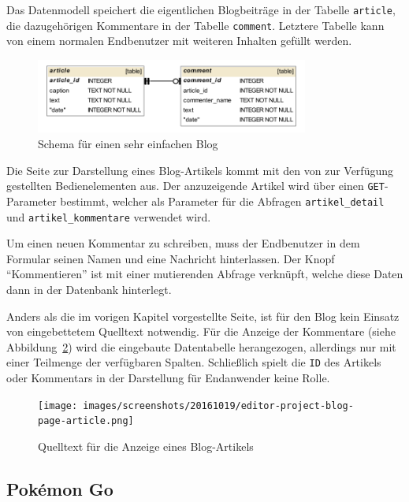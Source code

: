 Das Datenmodell speichert die eigentlichen Blogbeiträge in der Tabelle \texttt{article}, die dazugehörigen Kommentare in der Tabelle \texttt{comment}. Letztere Tabelle kann von einem normalen Endbenutzer mit weiteren Inhalten gefüllt werden.

\begin{figure}[h]
  \centering \includegraphics[width=0.8\textwidth]{images/db-schema/blog}
  \caption{Schema für einen sehr einfachen Blog}
  \label{fig:project-blog-schema}
\end{figure}

Die Seite zur Darstellung eines Blog-Artikels kommt mit den von \idename{} zur Verfügung gestellten Bedienelementen aus. Der anzuzeigende Artikel wird über einen \texttt{GET}-Parameter bestimmt, welcher als Parameter für die Abfragen \texttt{artikel\_detail} und \texttt{artikel\_kommentare} verwendet wird.

Um einen neuen Kommentar zu schreiben, muss der Endbenutzer in dem Formular seinen Namen und eine Nachricht hinterlassen. Der Knopf "`Kommentieren"' ist mit einer mutierenden Abfrage verknüpft, welche diese Daten dann in der Datenbank hinterlegt.

Anders als die im vorigen Kapitel  vorgestellte Seite, ist für den Blog kein Einsatz von eingebettetem Quelltext notwendig. Für die Anzeige der Kommentare (siehe Abbildung~\ref{fig:project-blog-page-article}) wird die eingebaute Datentabelle herangezogen, allerdings nur mit einer Teilmenge der verfügbaren Spalten. Schließlich spielt die \texttt{ID} des Artikels oder Kommentars in der Darstellung für Endanwender keine Rolle.

\begin{figure}[h]
  \centering \texttt{[image: images/screenshots/20161019/editor-project-blog-page-article.png]}
  \caption{Quelltext für die Anzeige eines Blog-Artikels}
  \label{fig:project-blog-page-article}
\end{figure}

\subsection{Pokémon Go}

